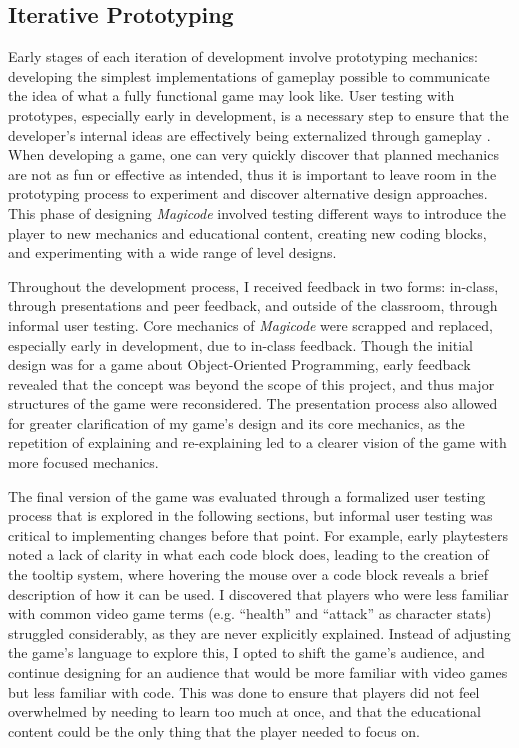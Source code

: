 \documentclass[10pt,twocolumn]{article}
\begin{document}
\subsection{Iterative Prototyping}
Early stages of each iteration of development involve prototyping mechanics: developing the simplest implementations of gameplay possible to communicate the idea of what a fully functional game may look like. User testing with prototypes, especially early in development, is a necessary step to ensure that the developer’s internal ideas are effectively being externalized through gameplay \cite{prototyping}. When developing a game, one can very quickly discover that planned mechanics are not as fun or effective as intended, thus it is important to leave room in the prototyping process to experiment and discover alternative design approaches. This phase of designing \textit{Magicode} involved testing different ways to introduce the player to new mechanics and educational content, creating new coding blocks, and experimenting with a wide range of level designs.

Throughout the development process, I received feedback in two forms: in-class, through presentations and peer feedback, and outside of the classroom, through informal user testing. Core mechanics of \textit{Magicode} were scrapped and replaced, especially early in development, due to in-class feedback. Though the initial design was for a game about Object-Oriented Programming, early feedback revealed that the concept was beyond the scope of this project, and thus major structures of the game were reconsidered. The presentation process also allowed for greater clarification of my game’s design and its core mechanics, as the repetition of explaining and re-explaining led to a clearer vision of the game with more focused mechanics.

The final version of the game was evaluated through a formalized user testing process that is explored in the following sections, but informal user testing was critical to implementing changes before that point. For example, early playtesters noted a lack of clarity in what each code block does, leading to the creation of the tooltip system, where hovering the mouse over a code block reveals a brief description of how it can be used. I discovered that players who were less familiar with common video game terms (e.g. “health” and “attack” as character stats) struggled considerably, as they are never explicitly explained. Instead of adjusting the game’s language to explore this, I opted to shift the game’s audience, and continue designing for an audience that would be more familiar with video games but less familiar with code. This was done to ensure that players did not feel overwhelmed by needing to learn too much at once, and that the educational content could be the only thing that the player needed to focus on.
\end{document}
